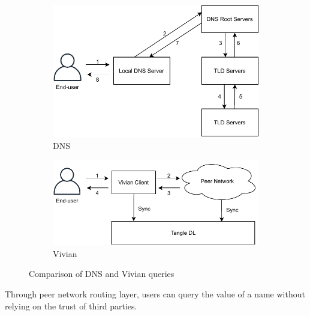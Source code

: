 \begin{figure}[h]
    \centering
    \begin{subfigure}[t]{0.45\textwidth}
        \centering
        \includegraphics[width=\textwidth,trim={0 0 0 -0.5cm}]{figs/dns_routing.pdf}
        \centering
        \caption{DNS}
    \end{subfigure}
    \centering
    \begin{subfigure}[b]{0.45\textwidth}
        \centering
        \includegraphics[width=\textwidth,trim={0 0 0 -0.5cm}]{figs/vivian_routing.pdf}
        \centering
        \caption{Vivian}
    \end{subfigure}
    \caption{Comparison of DNS and Vivian queries}
    \label{fig:query_compare}
\end{figure}

Through peer network routing layer, users can query the value of a name without relying on the trust of third parties.


